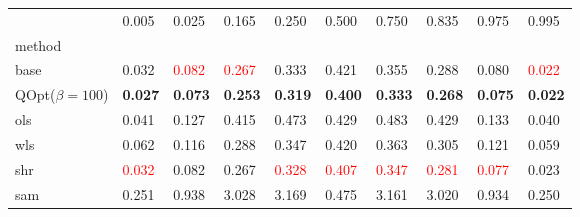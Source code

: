 \begin{tabular}{llllllllll}
\toprule
 & 0.005 & 0.025 & 0.165 & 0.250 & 0.500 & 0.750 & 0.835 & 0.975 & 0.995 \\
method &  &  &  &  &  &  &  &  &  \\
\midrule
base & 0.032 & \textcolor{red}{0.082} & \textcolor{red}{0.267} & 0.333 & 0.421 & 0.355 & 0.288 & 0.080 & \textcolor{red}{0.022} \\
\midrule
QOpt($\beta=100$) & \textbf{0.027} & \textbf{0.073} & \textbf{0.253} & \textbf{0.319} & \textbf{0.400} & \textbf{0.333} & \textbf{0.268} & \textbf{0.075} & \textbf{0.022} \\
ols & 0.041 & 0.127 & 0.415 & 0.473 & 0.429 & 0.483 & 0.429 & 0.133 & 0.040 \\
wls & 0.062 & 0.116 & 0.288 & 0.347 & 0.420 & 0.363 & 0.305 & 0.121 & 0.059 \\
shr & \textcolor{red}{0.032} & 0.082 & 0.267 & \textcolor{red}{0.328} & \textcolor{red}{0.407} & \textcolor{red}{0.347} & \textcolor{red}{0.281} & \textcolor{red}{0.077} & 0.023 \\
sam & 0.251 & 0.938 & 3.028 & 3.169 & 0.475 & 3.161 & 3.020 & 0.934 & 0.250 \\
\bottomrule
\end{tabular}